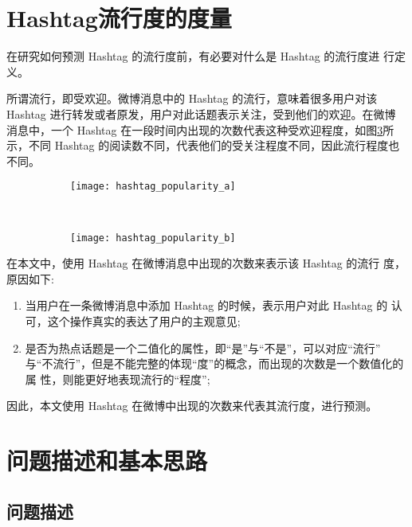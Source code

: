 \section{Hashtag流行度的度量}

在研究如何预测 Hashtag 的流行度前，有必要对什么是 Hashtag 的流行度进
行定义。

所谓流行，即受欢迎。微博消息中的 Hashtag 的流行，意味着很多用户对该 Hashtag 进行转发或者原发，用户对此话题表示关注，受到他们的欢迎。在微博 消息中，一个 Hashtag 在一段时间内出现的次数代表这种受欢迎程度，如图\ref{fig:hashtag_popularity}所 示，不同 Hashtag 的阅读数不同，代表他们的受关注程度不同，因此流行程度也 不同。


\begin{figure}[!htbp]
    \centering
    \begin{subfigure}[b]{0.5\textwidth}
      \texttt{[image: hashtag\_popularity\_a]}

      \label{fig:hashtag_popularity_a}
    \end{subfigure}%
    ~%
    \begin{subfigure}[b]{0.5\textwidth}
      \texttt{[image: hashtag\_popularity\_b]}

      \label{fig:hashtag_popularity_b}
    \end{subfigure}
    \label{fig:hashtag_popularity}
\end{figure}
在本文中，使用 Hashtag 在微博消息中出现的次数来表示该 Hashtag 的流行 度，原因如下:\begin{enumerate}
\item 当用户在一条微博消息中添加 Hashtag 的时候，表示用户对此 Hashtag 的 认可，这个操作真实的表达了用户的主观意见;
\item 是否为热点话题是一个二值化的属性，即“是”与“不是”，可以对应“流行” 与“不流行”，但是不能完整的体现“度”的概念，而出现的次数是一个数值化的属 性，则能更好地表现流行的“程度”;
\end{enumerate}

因此，本文使用 Hashtag 在微博中出现的次数来代表其流行度，进行预测。

\section{问题描述和基本思路}

\subsection{问题描述}

